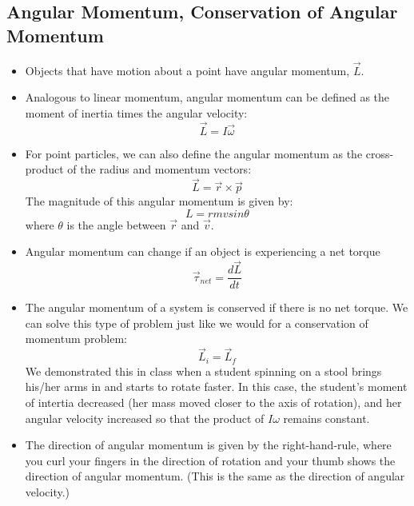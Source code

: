 \subsection{Angular Momentum, Conservation of Angular Momentum}
\label{angmomentum}
\begin{itemize}
\item Objects that have motion about a point have angular momentum, $\vec{L}$.
\item Analogous to linear momentum, angular momentum can be defined as the moment of inertia times the angular velocity:
$$ \vec{L} = I \vec{\omega} $$
\item For point particles, we can also define the angular momentum as the cross-product of the radius and momentum vectors:
$$ \vec{L} = \vec{r} \times \vec{p} $$
The magnitude of this angular momentum is given by:
$$ L = r m v sin\theta $$
where $\theta$ is the angle between $\vec{r}$ and $\vec{v}$.
\item Angular momentum can change if an object is experiencing a net torque
$$ \vec{\tau}_{net} = \frac{d \vec{L}}{dt} $$
\item The angular momentum of a system is conserved if there is no net torque.  We can solve this type of problem just like we would for a conservation of momentum problem:
$$ \vec{L}_i = \vec{L}_f $$
We demonstrated this in class when a student spinning on a stool
brings his/her arms in and starts to rotate faster.  In this case, the
student's moment of intertia decreased (her mass moved closer to the
axis of rotation), and her angular velocity increased so that the
product of $I \omega$ remains constant.
\item The direction of angular momentum is given by the
  right-hand-rule, where you curl your fingers in the direction of
  rotation and your thumb shows the direction of angular momentum.
  (This is the same as the direction of angular velocity.)
\end{itemize}

\vspace*{-.15in}
